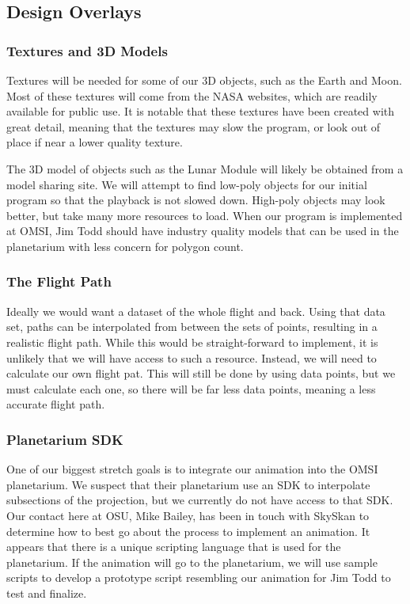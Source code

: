 \documentclass[onecolumn, draftclsnofoot,10pt, compsoc]{IEEEtran}
\begin{document}
    \subsection{Design Overlays}
	
	\subsubsection{Textures and 3D Models}
	Textures will be needed for some of our 3D objects, such as the Earth and Moon. Most of these textures will come from the NASA websites, which are readily available for public use. It is notable that these textures have been created with great detail, meaning that the textures may slow the program, or look out of place if near a lower quality texture. 
	
	The 3D model of objects such as the Lunar Module will likely be obtained from a model sharing site. We will attempt to find low-poly objects for our initial program so that the playback is not slowed down. High-poly objects may look better, but take many more resources to load. When our program is implemented at OMSI, Jim Todd should have industry quality models that can be used in the planetarium with less concern for polygon count. 
	
	\subsubsection{The Flight Path}
	Ideally we would want a dataset of the whole flight and back. Using that data set, paths can be interpolated from between the sets of points, resulting in a realistic flight path. While this would be straight-forward to implement, it is unlikely that we will have access to such a resource. Instead, we will need to calculate our own flight pat. This will still be done by using data points, but we must calculate each one, so there will be far less data points, meaning a less accurate flight path.
	
	\subsubsection{Planetarium SDK}
	One of our biggest stretch goals is to integrate our animation into the OMSI planetarium. We suspect that their planetarium use an SDK to interpolate subsections of the projection, but we currently do not have access to that SDK. Our contact here at OSU, Mike Bailey, has been in touch with SkySkan to determine how to best go about the process to implement an animation. It appears that there is a unique scripting language that is used for the planetarium. If the animation will go to the planetarium, we will use sample scripts to develop a prototype script resembling our animation for Jim Todd to test and finalize. 
    
\end{document}
